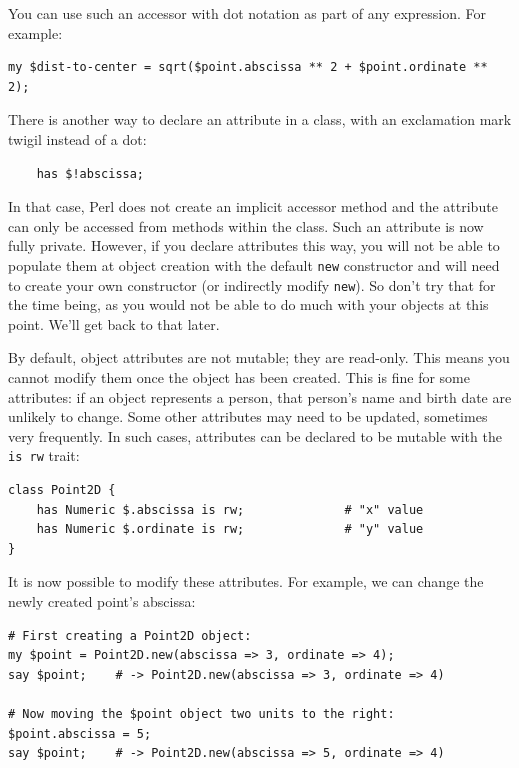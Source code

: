 You can use such an accessor with dot notation as part of any 
expression. For example:

\begin{verbatim}
my $dist-to-center = sqrt($point.abscissa ** 2 + $point.ordinate ** 2);
\end{verbatim}
%

There is another way to declare an attribute in a class, with 
an exclamation mark twigil instead of a dot:

\begin{verbatim}
    has $!abscissa;  
\end{verbatim}
%
In that case, Perl does not create an implicit accessor method 
and the attribute can only be accessed from methods within 
the class. Such an attribute is now fully private. 
However, if you declare attributes this way, you 
will not be able to populate them at object creation with 
the default {\tt new} constructor and will need to create your 
own constructor (or indirectly modify {\tt new}). So don't try 
that for the time being, as you would not be able to do much 
with your objects at this point. We'll get back to that later.

By default, object attributes are not mutable; they are read-only. 
This means you cannot modify them once the object has been created. 
This is fine for some attributes: if an object represents a 
person, that person's name and birth date are unlikely to 
change. Some other attributes may need to be updated, sometimes 
very frequently. In such cases, attributes can be declared 
to be mutable with the {\tt is rw} trait:

\begin{verbatim}
class Point2D {
    has Numeric $.abscissa is rw;              # "x" value
    has Numeric $.ordinate is rw;              # "y" value
}
\end{verbatim}
%
It is now possible to modify these attributes. For example, 
we can change the newly created point's abscissa:

\begin{verbatim}
# First creating a Point2D object:
my $point = Point2D.new(abscissa => 3, ordinate => 4);
say $point;    # -> Point2D.new(abscissa => 3, ordinate => 4)

# Now moving the $point object two units to the right:
$point.abscissa = 5; 
say $point;    # -> Point2D.new(abscissa => 5, ordinate => 4)
\end{verbatim}


